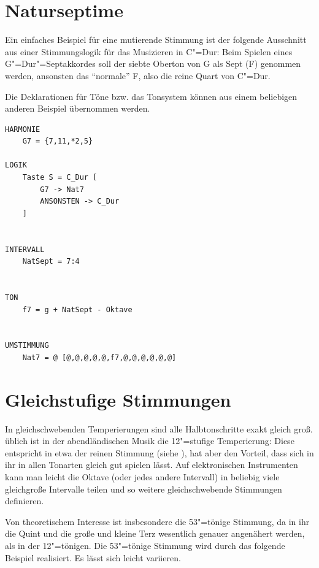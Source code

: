 \section{Naturseptime}
\label{sec:EX_NATSEVEN}

Ein einfaches Beispiel für eine mutierende Stimmung ist der 
folgende Ausschnitt aus einer Stimmungslogik für das Musizieren 
in C"=Dur: Beim Spielen eines G"=Dur"=Septakkordes soll der siebte 
Oberton von G als Sept (F) genommen werden, ansonsten das "`normale"'
F, also die reine Quart von C"=Dur. 

Die Deklarationen für Töne bzw. das Tonsystem  können 
aus einem beliebigen anderen Beispiel übernommen werden.


\begin{verbatim}
HARMONIE 
    G7 = {7,11,*2,5}

LOGIK 
    Taste S = C_Dur [
        G7 -> Nat7 
        ANSONSTEN -> C_Dur 
    ]


INTERVALL 
    NatSept = 7:4


TON
    f7 = g + NatSept - Oktave


UMSTIMMUNG 
    Nat7 = @ [@,@,@,@,@,f7,@,@,@,@,@,@]
\end{verbatim}

\section{Gleichstufige Stimmungen}
\label{sec:EX_EQUAL}

In gleichschwebenden Temperierungen sind alle Halbtonschritte 
exakt gleich groß. üblich ist in der abendländischen Musik 
die 12"=stufige Temperierung: Diese entspricht in etwa der reinen 
Stimmung (siehe ), hat aber den Vorteil, 
dass sich in ihr in allen Tonarten gleich gut spielen lässt. 
Auf elektronischen Instrumenten kann man leicht die Oktave (oder 
jedes andere Intervall) in beliebig viele gleichgroße Intervalle 
teilen und so weitere gleichschwebende Stimmungen definieren.


Von theoretischem Interesse ist insbesondere die 53"=tönige 
Stimmung, da in ihr die Quint und die große und kleine Terz 
wesentlich genauer angenähert werden, als in der 12"=tönigen. 
Die 53"=tönige Stimmung wird durch 
das folgende Beispiel realisiert. Es lässt sich leicht variieren.

